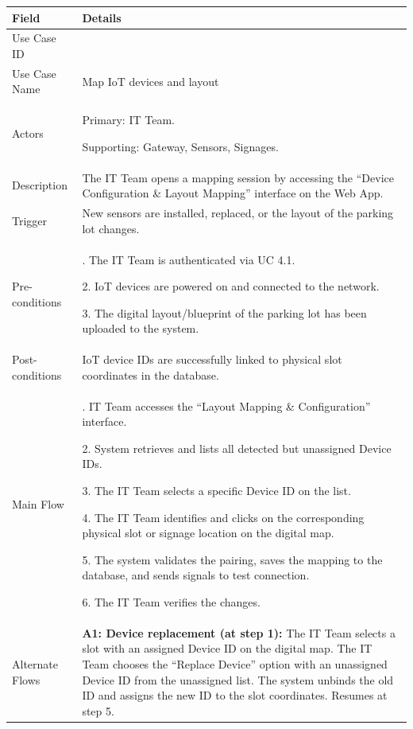\begin{table}[H]
\small
\renewcommand{\arraystretch}{1.4}
\begin{tabularx}{\textwidth}{|>{\raggedright\arraybackslash}p{3.5cm}|>{\RaggedRight\arraybackslash}X|}
\hline
\rowcolor{gray!20} \textbf{Field} & \textbf{Details} \\
\hline
Use Case ID & 2.3 \\
\hline
Use Case Name & Map IoT devices and layout \\
\hline
Actors & Primary: IT Team. \par Supporting: Gateway, Sensors, Signages. \\
\hline
Description & The IT Team opens a mapping session by accessing the ``Device Configuration \& Layout Mapping'' interface on the Web App. \\
\hline
Trigger & New sensors are installed, replaced, or the layout of the parking lot changes. \\
\hline
Pre-conditions & 1. The IT Team is authenticated via UC 4.1. \par 2. IoT devices are powered on and connected to the network. \par 3. The digital layout/blueprint of the parking lot has been uploaded to the system. \\
\hline
Post-conditions & IoT device IDs are successfully linked to physical slot coordinates in the database. \\
\hline
Main Flow & 
1. IT Team accesses the ``Layout Mapping \& Configuration'' interface. \par
2. System retrieves and lists all detected but unassigned Device IDs. \par
3. The IT Team selects a specific Device ID on the list. \par
4. The IT Team identifies and clicks on the corresponding physical slot or signage location on the digital map. \par
5. The system validates the pairing, saves the mapping to the database, and sends signals to test connection. \par
6. The IT Team verifies the changes. \\
\hline
Alternate Flows & 
\textbf{A1: Device replacement (at step 1):} The IT Team selects a slot with an assigned Device ID on the digital map. The IT Team chooses the ``Replace Device'' option with an unassigned Device ID from the unassigned list. The system unbinds the old ID and assigns the new ID to the slot coordinates. Resumes at step 5. \par \vspace{0.5em}

\end{tabularx}
\end{table}

